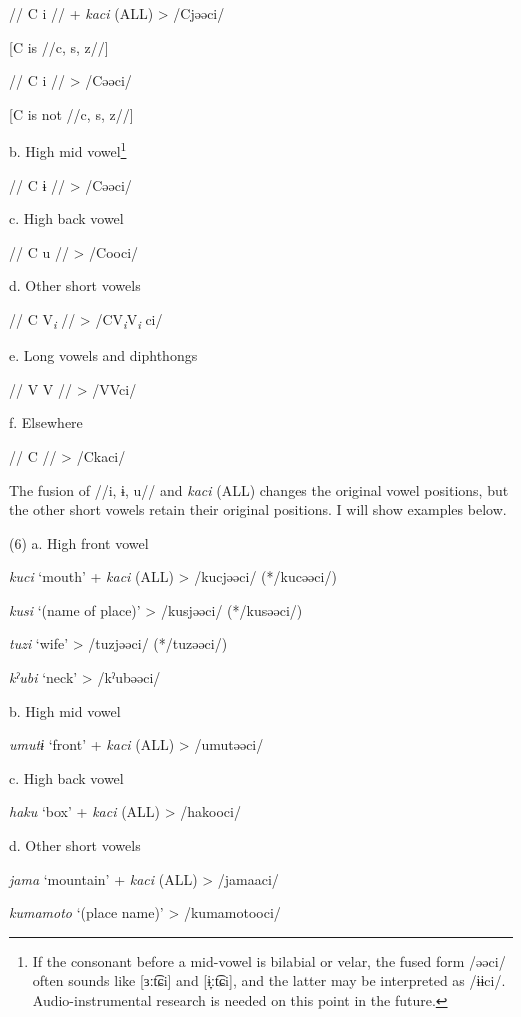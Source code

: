     //  C  i  //  +  \textit{kaci} (ALL)  >  /Cjəəci/

    [C is //c, s, z//]

    //  C  i  //      >  /Cəəci/

    [C is not //c, s, z//]

  b.  High mid vowel\footnote{If the consonant before a mid-vowel is bilabial or velar, the fused form /əəci/ often sounds like [ɜːt͡ɕi] and [ɨ̞ːt͡ɕi], and the latter may be interpreted as /ɨɨci/. Audio-instrumental research is needed on this point in the future.}

    //  C  ɨ  //      >  /Cəəci/

  c.  High back vowel

    //  C  u  //      >  /Cooci/

  d.  Other short vowels

    //  C  V\textit{\textsubscript{i}}  //      >  /CV\textit{\textsubscript{i}}V\textit{\textsubscript{i} }ci/

  e.  Long vowels and diphthongs

    //  V  V  //      >  /VVci/

  f.  Elsewhere

    //  C  //        >  /Ckaci/

The fusion of //i, ɨ, u// and \textit{kaci} (ALL) changes the original vowel positions, but the other short vowels retain their original positions. I will show examples below.

(6)  a.  High front vowel  

    \textit{kuci}  ‘mouth’  +  \textit{kaci} (ALL)  >  /kucjəəci/  (*/kucəəci/)

    \textit{kusi}  ‘(name of place)’      >  /kusjəəci/  (*/kusəəci/)

    \textit{tuzi}  ‘wife’      >  /tuzjəəci/  (*/tuzəəci/)

    \textit{kˀubi}  ‘neck’      >  /kˀubəəci/  

  b.  High mid vowel

    \textit{umutɨ}  ‘front’  +  \textit{kaci} (ALL)  >  /umutəəci/  

  c.  High back vowel  

    \textit{haku}  ‘box’  +  \textit{kaci} (ALL)  >  /hakooci/  

  d.  Other short vowels

    \textit{jama}  ‘mountain’  +  \textit{kaci} (ALL)  >  /jamaaci/  

    \textit{kumamoto}  ‘(place name)’      >  /kumamotooci/  

